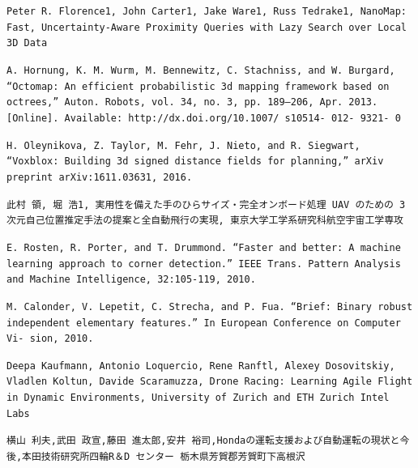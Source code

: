 \documentclass[uplatex,a4j,10pt]{jsarticle}
\begin{document}
\begin{thebibliography}{99}
\texttt{Peter R. Florence1, John Carter1, Jake Ware1, Russ Tedrake1, NanoMap: Fast, Uncertainty-Aware Proximity Queries with Lazy Search over Local 3D Data}

\texttt{A. Hornung, K. M. Wurm, M. Bennewitz, C. Stachniss, and W. Burgard, “Octomap: An efficient probabilistic 3d mapping framework based on octrees,” Auton. Robots, vol. 34, no. 3, pp. 189–206, Apr. 2013. [Online]. Available: http://dx.doi.org/10.1007/ s10514- 012- 9321- 0}

\texttt{H. Oleynikova, Z. Taylor, M. Fehr, J. Nieto, and R. Siegwart, “Voxblox: Building 3d signed distance fields for planning,” arXiv preprint arXiv:1611.03631, 2016.}

\texttt{此村 領, 堀 浩1, 実用性を備えた手のひらサイズ・完全オンボード処理 UAV のための 3 次元自己位置推定手法の提案と全自動飛行の実現, 東京大学工学系研究科航空宇宙工学専攻}

\texttt{E. Rosten, R. Porter, and T. Drummond. “Faster and better: A machine learning approach to corner detection.” IEEE Trans. Pattern Analysis and Machine Intelligence, 32:105-119, 2010.}

\texttt{M. Calonder, V. Lepetit, C. Strecha, and P. Fua. “Brief: Binary robust independent elementary features.” In European Conference on Computer Vi- sion, 2010.}

\texttt{Deepa Kaufmann, Antonio Loquercio, Rene Ranftl, Alexey Dosovitskiy, Vladlen Koltun, Davide Scaramuzza, Drone Racing: Learning Agile Flight in Dynamic Environments, University of Zurich and ETH Zurich Intel Labs}

\texttt{横山 利夫,武田 政宣,藤田 進太郎,安井 裕司,Hondaの運転支援および自動運転の現状と今後,本田技術研究所四輪R＆D センター 栃木県芳賀郡芳賀町下高根沢}

\end{thebibliography}
\end{document}
